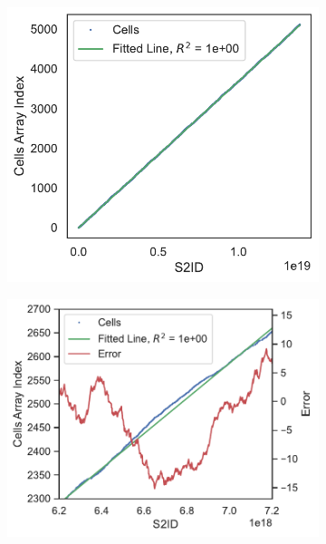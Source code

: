 \begin{figure}[H]
        \centering
  \begin{subfigure}[t]{.30\linewidth}
    \centering\includegraphics[clip,trim=0.0cm 0cm 0.0cm 0cm,width=\linewidth]{chapter_3_polylidar3d/imgs/ga_linear_interp_1.pdf}
    \caption{\label{fig:ch3_linear_interp_1}}
  \end{subfigure}
\quad \quad
  \begin{subfigure}[t]{.35\linewidth}
    \centering
    \includegraphics[width=\linewidth]{chapter_3_polylidar3d/imgs/ga_linear_interp_2.pdf}

\end{subfigure}
\end{figure}
